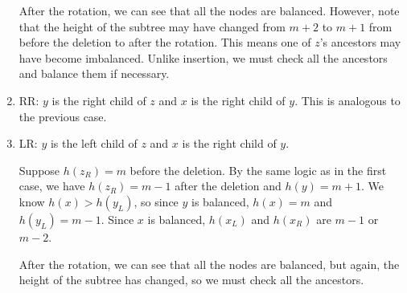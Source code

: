 \documentclass[12pt]{article}
\begin{document}
\begin{enumerate}
  After the rotation, we can see that all the nodes are balanced. However, note that the height of the subtree may have changed from $m+2$ to $m+1$ from before the deletion to after the rotation. This means one of $z$'s ancestors may have become imbalanced. Unlike insertion, we must check all the ancestors and balance them if necessary.



  \item RR: $y$ is the right child of $z$ and $x$ is the right child of $y$. This is analogous to the previous case.

  \item LR: $y$ is the left child of $z$ and $x$ is the right child of $y$.

  Suppose $h(z_R) = m$ before the deletion. By the same logic as in the first case, we have $h(z_R) = m-1$ after the deletion and $h(y) = m+1$. We know $h(x) > h(y_L)$, so since $y$ is balanced, $h(x) = m$ and $h(y_L) = m-1$. Since $x$ is balanced, $h(x_L)$ and $h(x_R)$ are $m-1$ or $m-2$.

  After the rotation, we can see that all the nodes are balanced, but again, the height of the subtree has changed, so we must check all the ancestors.


\end{enumerate}
\end{document}
